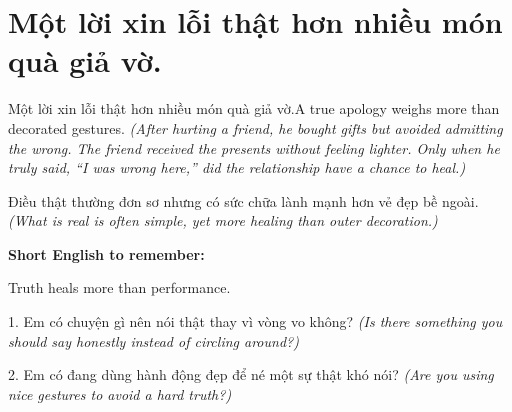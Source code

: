 \section{Một lời xin lỗi thật hơn nhiều món quà giả vờ.}
\begin{truyen}{Một lời xin lỗi thật hơn nhiều món quà giả vờ.}{A true apology weighs more than decorated gestures.}
\textit{(After hurting a friend, he bought gifts but avoided admitting the wrong. The friend received the presents without feeling lighter. Only when he truly said, “I was wrong here,” did the relationship have a chance to heal.)}
\end{truyen}
\begin{baihoc}
Điều thật thường đơn sơ nhưng có sức chữa lành mạnh hơn vẻ đẹp bề ngoài.
\textit{(What is real is often simple, yet more healing than outer decoration.)}
\end{baihoc}
\begin{ghinhoanh}
\textbf{Short English to remember:}

Truth heals more than performance.
\end{ghinhoanh}
\begin{tuhocnhanh}
1. Em có chuyện gì nên nói thật thay vì vòng vo không? \textit{(Is there something you should say honestly instead of circling around?)}

2. Em có đang dùng hành động đẹp để né một sự thật khó nói? \textit{(Are you using nice gestures to avoid a hard truth?)}
\end{tuhocnhanh}
\ngancach

